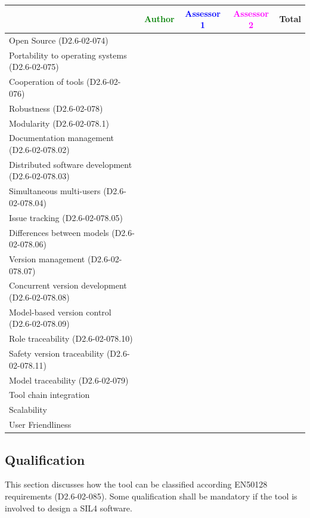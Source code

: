 \begin{tabular}{|l | c | c | c | c|}
\hline
& \textcolor{green}{Author} & \textcolor{blue}{Assessor 1} & \textcolor{magenta}{Assessor 2} & Total \\
\hline 
Open Source (D2.6-02-074) & & & &  \\
\hline 
Portability to operating systems (D2.6-02-075) & & & &  \\
\hline
Cooperation of tools (D2.6-02-076) & & & &  \\
\hline
Robustness (D2.6-02-078) & & & & \\
\hline
Modularity (D2.6-02-078.1) & & & & \\
\hline
Documentation management (D2.6-02-078.02) & & & & \\
\hline
Distributed software development (D2.6-02-078.03)  & & & & \\
\hline
Simultaneous multi-users (D2.6-02-078.04)   & & & & \\
\hline
Issue tracking (D2.6-02-078.05) & & & & \\
\hline
Differences between models (D2.6-02-078.06) & & & & \\
\hline
Version management (D2.6-02-078.07) & & & & \\
\hline
Concurrent version development (D2.6-02-078.08) & & & & \\
\hline
Model-based version control (D2.6-02-078.09) & & & & \\
\hline
Role traceability (D2.6-02-078.10) & & & & \\
\hline
Safety version traceability (D2.6-02-078.11) & & & & \\
\hline
Model traceability (D2.6-02-079) & & & & \\
\hline
Tool chain integration & & & & \\
\hline
Scalability & & & & \\
\hline
User Friendliness & & & & \\
\hline
\end{tabular}



\subsection{Qualification}

This section discusses how the tool can be classified according EN50128 requirements (D2.6-02-085). Some qualification shall be mandatory  if the tool is involved to design a SIL4 software.



